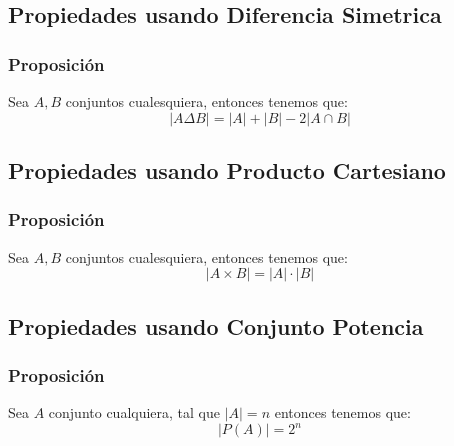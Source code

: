 \documentclass[12pt]{report}                                    %
\begin{document}
        \subsection{Propiedades usando Diferencia Simetrica}

            \subsubsection{Proposición}
                Sea $A, B$ conjuntos cualesquiera, entonces tenemos que:
                \begin{equation*}
                    |A \Delta B| = |A| + |B| - 2|A \cap B|
                \end{equation*}

        \clearpage
        \subsection{Propiedades usando Producto Cartesiano}

            \subsubsection{Proposición}
                Sea $A, B$ conjuntos cualesquiera, entonces tenemos que:
                \begin{equation*}
                    |A \times B| = |A| \cdot |B|
                \end{equation*}

        \subsection{Propiedades usando Conjunto Potencia}

            \subsubsection{Proposición}
                Sea $A$ conjunto cualquiera, tal que $|A| = n$ entonces tenemos que:
                \begin{equation*}
                    |P(A)| = 2^n
                \end{equation*}
\end{document}
